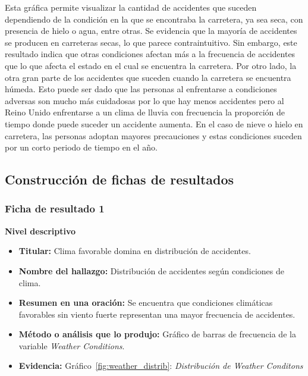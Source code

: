 \documentclass[12pt]{article}
\begin{document}
Esta gráfica permite visualizar la cantidad de accidentes que suceden dependiendo 
de la condición en la que se encontraba la carretera, ya sea seca, con presencia 
de hielo o agua, entre otras. Se evidencia que la mayoría de accidentes se producen 
en carreteras secas, lo que parece contraintuitivo. Sin embargo, este resultado 
indica que otras condiciones afectan más a la frecuencia de accidentes que lo que
afecta el estado en el cual se encuentra la carretera. Por otro lado, la otra 
gran parte de los accidentes que suceden cuando la carretera se encuentra húmeda.
Esto puede ser dado que las personas al enfrentarse a condiciones adversas son 
mucho más cuidadosas por lo que hay menos accidentes pero al Reino Unido 
enfrentarse a un clima de lluvia con frecuencia la proporción de tiempo donde 
puede suceder un accidente aumenta. En el caso de nieve o hielo en carretera, 
las personas adoptan mayores precauciones y estas condiciones suceden por un 
corto periodo de tiempo en el año. 






\subsection{Construcción de fichas de resultados}

\subsubsection{Ficha de resultado 1}
\textbf{Nivel descriptivo}
\begin{itemize}
    \item \textbf{Titular:} Clima favorable domina en distribución de accidentes.

    \item \textbf{Nombre del hallazgo:} Distribución de accidentes según condiciones de clima.

    \item \textbf{Resumen en una oración:} Se encuentra que condiciones climáticas favorables
    sin viento fuerte representan una mayor frecuencia de accidentes.

    \item \textbf{Método o análisis que lo produjo:} Gráfico de barras de frecuencia de la variable
    \textit{Weather Conditions}.

    \item \textbf{Evidencia:} Gráfico~\ref{fig:weather_distrib}: \textit{Distribución de Weather Conditons} \\
\end{itemize} 
\end{document}
